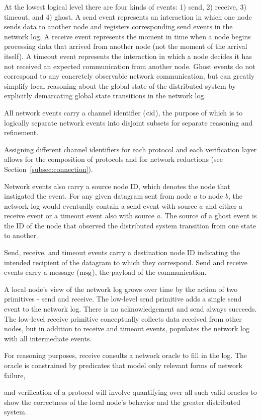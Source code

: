 At the lowest logical level there are four kinds of events: 1) send, 2) receive,
3) timeout, and 4) ghost. A send event represents an interaction in which one
node sends data to another node and registers corresponding send events in the
network log. A receive event represents the moment in time when a node begins
processing data that arrived from another node (not the moment of the arrival
itself). A timeout event represents the interaction in which a node decides it
has not received an expected communication from another node. Ghost events do
not correspond to any concretely observable network communication, but can
greatly simplify local reasoning about the global state of the distributed
system by explicitly demarcating global state transitions in the network log.

All network events carry a channel identifier ($\mathrm{cid}$), the purpose of which is
to logically separate network events into disjoint subsets for separate
reasoning and refinement.  Assigning different channel identifiers for each
protocol and each verification layer allows for the composition of protocols and
for network reductions (see Section~\ref{subsec:connection}).

Network events also carry a source node ID, which denotes the node that
instigated the event. For any given datagram sent from node $a$ to node $b$, the
network log would eventually contain a send event with source $a$ and either a
receive event or a timeout event also with source $a$. The source of a ghost
event is the ID of the node that observed the distributed system transition from
one state to another.  Send, receive, and timeout events carry a
destination node ID indicating the intended recipient of the datagram to which
they correspond. Send and receive events carry a message ($\mathrm{msg}$), the payload
of the communication.

A local node's view of the network log grows over time by the action of two
primitives - send and receive. The low-level send primitive adds a single send
event to the network log. There is no acknowledgement and send always succeeds.
The low-level receive primitive conceptually collects data received from other
nodes, but in addition to receive and timeout events, populates the network log
with all intermediate events.  For reasoning purposes, receive consults a network oracle
to fill in the log. The oracle is constrained by predicates that model only
relevant forms of network failure,  and
verification of a protocol will involve quantifying over all such valid oracles
to show the correctness of the local node's behavior and the greater distributed
system.

